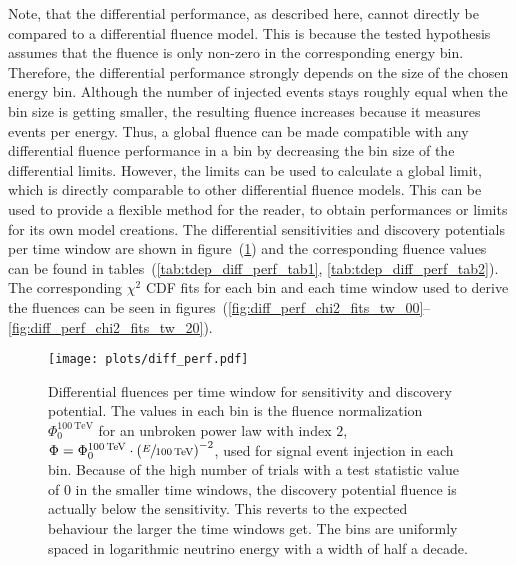 Note, that the differential performance, as described here, cannot directly be compared to a differential fluence model.
This is because the tested hypothesis assumes that the fluence is only non-zero in the corresponding energy bin.
Therefore, the differential performance strongly depends on the size of the chosen energy bin.
Although the number of injected events stays roughly equal when the bin size is getting smaller, the resulting fluence increases because it measures events per energy.
Thus, a global fluence can be made compatible with any differential fluence performance in a bin by decreasing the bin size of the differential limits.
However, the limits can be used to calculate a global limit, which is directly comparable to other differential fluence models.
This can be used to provide a flexible method for the reader, to obtain performances or limits for its own model creations.
The differential sensitivities and discovery potentials per time window are shown in figure~(\ref{fig:tdep_diff_perf}) and the corresponding fluence values can be found in tables~(\ref{tab:tdep_diff_perf_tab1}, \ref{tab:tdep_diff_perf_tab2}).
The corresponding $\chi^2$ CDF fits for each bin and each time window used to derive the fluences can be seen in figures~(\ref{fig:diff_perf_chi2_fits_tw_00}--\ref{fig:diff_perf_chi2_fits_tw_20}).

\begin{figure}[htbp]
  \centering
  \texttt{[image: plots/diff\_perf.pdf]}
  \caption[Time-dependent differential performances]{
    Differential fluences per time window for sensitivity and discovery potential.
    The values in each bin is the fluence normalization $\Phi_0^{\SI{100}{\TeV}}$ for an unbroken power law with index $2$, $\Phi = \Phi_0^{\SI{100}{\TeV}}\cdot \left(\sfrac{E}{\SI{100}{\TeV}}\right)^{-2}$, used for signal event injection in each bin.
    Because of the high number of trials with a test statistic value of $0$ in the smaller time windows, the discovery potential fluence is actually below the sensitivity.
    This reverts to the expected behaviour the larger the time windows get.
    The bins are uniformly spaced in logarithmic neutrino energy with a width of half a decade.
  }
  \label{fig:tdep_diff_perf}
\end{figure}

